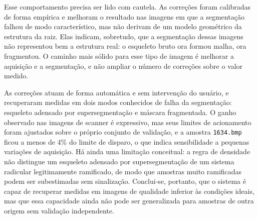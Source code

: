 \documentclass[12pt]{article}
\begin{document}
\begin{table}[!htbp]
\centering
\caption{Imagens do grupo Teruo em que houve correção de comprimento.}
\label{tab:correcoes}
\end{table}

Esse comportamento precisa ser lido com cautela. As correções foram calibradas de forma empírica e melhoram o resultado nas imagens em que a segmentação falhou de modo característico, mas não derivam de um modelo geométrico da estrutura da raiz. Elas indicam, sobretudo, que a segmentação dessas imagens não representou bem a estrutura real: o esqueleto bruto ora formou malha, ora fragmentou. O caminho mais sólido para esse tipo de imagem é melhorar a aquisição e a segmentação, e não ampliar o número de correções sobre o valor medido.

As correções atuam de forma automática e sem intervenção do usuário, e recuperaram medidas em dois modos conhecidos de falha da segmentação: esqueleto adensado por supersegmentação e máscara fragmentada. O ganho observado nas imagens de scanner é expressivo, mas seus limites de acionamento foram ajustados sobre o próprio conjunto de validação, e a amostra \texttt{1634.bmp} ficou a menos de 4\% do limite de disparo, o que indica sensibilidade a pequenas variações de aquisição. Há ainda uma limitação conceitual: a regra de densidade não distingue um esqueleto adensado por supersegmentação de um sistema radicular legitimamente ramificado, de modo que amostras muito ramificadas podem ser subestimadas sem sinalização. Conclui-se, portanto, que o sistema é capaz de recuperar medidas em imagens de qualidade inferior às condições ideais, mas que essa capacidade ainda não pode ser generalizada para amostras de outra origem sem validação independente.
\end{document}

